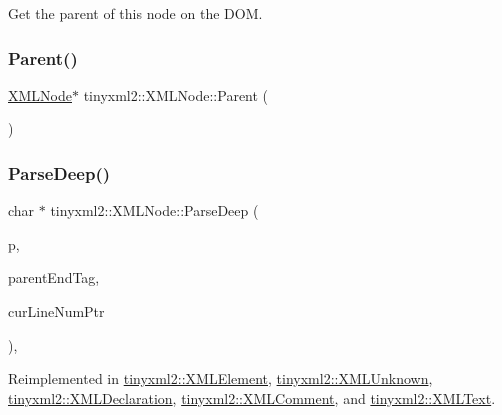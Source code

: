 Get the parent of this node on the D\+OM. 

\mbox{\label{classtinyxml2_1_1_x_m_l_node_a76029693a5a54fbb721a41d7a0ca8a97}} 
\subsubsection{\texorpdfstring{Parent()}{Parent()}\hspace{0.1cm}{\footnotesize\ttfamily [2/2]}}
{\footnotesize\ttfamily \mbox{\hyperlink{classtinyxml2_1_1_x_m_l_node}{X\+M\+L\+Node}}$\ast$ tinyxml2\+::\+X\+M\+L\+Node\+::\+Parent (\begin{DoxyParamCaption}{ }\end{DoxyParamCaption})\hspace{0.3cm}{\ttfamily [inline]}}

\mbox{\label{classtinyxml2_1_1_x_m_l_node_a916e498914baecbc9a1f012352ef7c69}} 
\subsubsection{\texorpdfstring{Parse\+Deep()}{ParseDeep()}}
{\footnotesize\ttfamily char $\ast$ tinyxml2\+::\+X\+M\+L\+Node\+::\+Parse\+Deep (\begin{DoxyParamCaption}\item[{char $\ast$}]{p,  }\item[{\mbox{\hyperlink{classtinyxml2_1_1_str_pair}{Str\+Pair}} $\ast$}]{parent\+End\+Tag,  }\item[{int $\ast$}]{cur\+Line\+Num\+Ptr }\end{DoxyParamCaption})\hspace{0.3cm}{\ttfamily [protected]}, {\ttfamily [virtual]}}



Reimplemented in \mbox{\hyperlink{classtinyxml2_1_1_x_m_l_element_a072998100b7d0ba5e8aeac6dd6dfb31b}{tinyxml2\+::\+X\+M\+L\+Element}}, \mbox{\hyperlink{classtinyxml2_1_1_x_m_l_unknown_aefc332cc1e6e25736f364d1e5eeb31fe}{tinyxml2\+::\+X\+M\+L\+Unknown}}, \mbox{\hyperlink{classtinyxml2_1_1_x_m_l_declaration_a42a2a36f4d78dc745063b79c16538b9b}{tinyxml2\+::\+X\+M\+L\+Declaration}}, \mbox{\hyperlink{classtinyxml2_1_1_x_m_l_comment_a3430281eed8d1023bafa9e633f44f509}{tinyxml2\+::\+X\+M\+L\+Comment}}, and \mbox{\hyperlink{classtinyxml2_1_1_x_m_l_text_af3b93344f1183482e1683f5922ac9c68}{tinyxml2\+::\+X\+M\+L\+Text}}.

